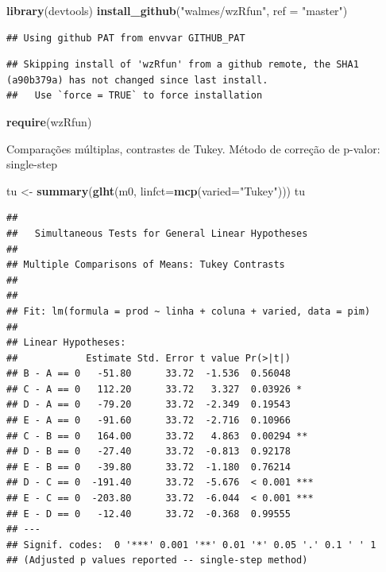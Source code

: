 \documentclass[
]{book}
\newenvironment{Shaded}{\begin{snugshade}}{\end{snugshade}}
\newcommand{\DataTypeTok}[1]{\textcolor[rgb]{0.13,0.29,0.53}{#1}}
\newcommand{\KeywordTok}[1]{\textcolor[rgb]{0.13,0.29,0.53}{\textbf{#1}}}
\newcommand{\NormalTok}[1]{#1}
\newcommand{\StringTok}[1]{\textcolor[rgb]{0.31,0.60,0.02}{#1}}
\begin{document}
\begin{Shaded}
\begin{Highlighting}[]
\KeywordTok{library}\NormalTok{(devtools) }
\KeywordTok{install_github}\NormalTok{(}\StringTok{"walmes/wzRfun"}\NormalTok{, }\DataTypeTok{ref =} \StringTok{"master"}\NormalTok{) }
\end{Highlighting}
\end{Shaded}

\begin{verbatim}
## Using github PAT from envvar GITHUB_PAT
\end{verbatim}

\begin{verbatim}
## Skipping install of 'wzRfun' from a github remote, the SHA1 (a90b379a) has not changed since last install.
##   Use `force = TRUE` to force installation
\end{verbatim}

\begin{Shaded}
\begin{Highlighting}[]
\KeywordTok{require}\NormalTok{(wzRfun)}
\end{Highlighting}
\end{Shaded}

Comparações múltiplas, contrastes de Tukey. Método de correção de p-valor: single-step

\begin{Shaded}
\begin{Highlighting}[]
\NormalTok{tu <-}\StringTok{ }\KeywordTok{summary}\NormalTok{(}\KeywordTok{glht}\NormalTok{(m0, }\DataTypeTok{linfct=}\KeywordTok{mcp}\NormalTok{(}\DataTypeTok{varied=}\StringTok{"Tukey"}\NormalTok{))) }
\NormalTok{tu}
\end{Highlighting}
\end{Shaded}

\begin{verbatim}
## 
##   Simultaneous Tests for General Linear Hypotheses
## 
## Multiple Comparisons of Means: Tukey Contrasts
## 
## 
## Fit: lm(formula = prod ~ linha + coluna + varied, data = pim)
## 
## Linear Hypotheses:
##            Estimate Std. Error t value Pr(>|t|)    
## B - A == 0   -51.80      33.72  -1.536  0.56048    
## C - A == 0   112.20      33.72   3.327  0.03926 *  
## D - A == 0   -79.20      33.72  -2.349  0.19543    
## E - A == 0   -91.60      33.72  -2.716  0.10966    
## C - B == 0   164.00      33.72   4.863  0.00294 ** 
## D - B == 0   -27.40      33.72  -0.813  0.92178    
## E - B == 0   -39.80      33.72  -1.180  0.76214    
## D - C == 0  -191.40      33.72  -5.676  < 0.001 ***
## E - C == 0  -203.80      33.72  -6.044  < 0.001 ***
## E - D == 0   -12.40      33.72  -0.368  0.99555    
## ---
## Signif. codes:  0 '***' 0.001 '**' 0.01 '*' 0.05 '.' 0.1 ' ' 1
## (Adjusted p values reported -- single-step method)
\end{verbatim}
\end{document}
